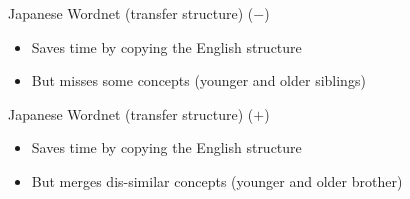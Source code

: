 \documentclass{beamer}
\begin{document}
\begin{frame}{Japanese Wordnet (transfer structure) ($-$)}

  \begin{center}
  \end{center}
    \begin{itemize}
    \item Saves time by copying the English structure
    \item But misses some concepts (younger and older siblings)
    \end{itemize}


  \end{frame}
  
\begin{frame}{Japanese Wordnet (transfer structure) ($+$)}

  \begin{center}

  \end{center}\begin{itemize}
    \item Saves time by copying the English structure
    \item But merges dis-similar concepts (younger and older brother)
    \end{itemize}

\end{frame}
\end{document}
